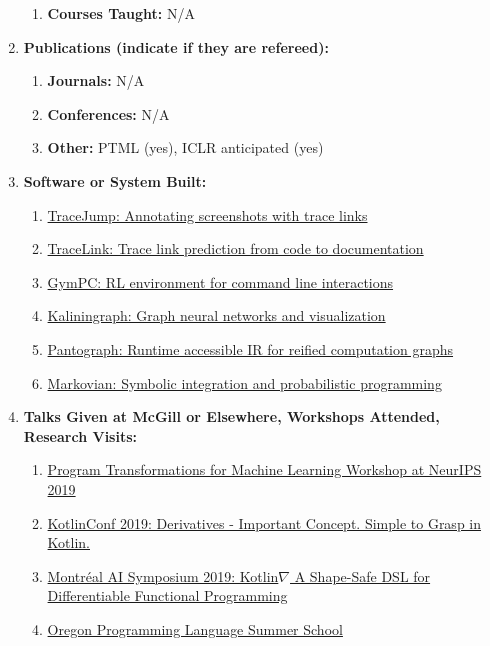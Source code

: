 \documentclass[11pt]{article}
\begin{document}
\begin{enumerate}
\begin{enumerate}
            \item \textbf{Courses Taught:} N/A

        \end{enumerate}

        \item \textbf{Publications (indicate if they are refereed):}
        \begin{enumerate}
            \item \textbf{Journals:} N/A

            \item \textbf{Conferences:} N/A

            \item \textbf{Other:} PTML (yes), ICLR anticipated (yes)

        \end{enumerate}

        \item \textbf{Software or System Built:}

        \begin{enumerate}
            \item \href{https://github.com/acejump/tracejump}{TraceJump: Annotating screenshots with trace links}
            \item \href{https://github.com/breandan/tracelink}{TraceLink: Trace link prediction from code to documentation}
            \item \href{https://github.com/breandan/gym-pc}{GymPC: RL environment for command line interactions}
            \item \href{https://github.com/breandan/kaliningraph}{Kaliningraph: Graph neural networks and visualization}
            \item \href{https://github.com/breandan/pantograph}{Pantograph: Runtime accessible IR for reified computation graphs}
            \item \href{https://github.com/breandan/markovian}{Markovian: Symbolic integration and probabilistic programming}
        \end{enumerate}

        \item \textbf{Talks Given at McGill or Elsewhere, Workshops Attended, Research Visits:}

        \begin{enumerate}
            \item \href{https://program-transformations.github.io/}{Program Transformations for Machine Learning Workshop at NeurIPS 2019}
            \item \href{https://kotlinconf.com/2019/talks/}{KotlinConf 2019: Derivatives - Important Concept. Simple to Grasp in Kotlin.}
            \item \href{https://kotlinconf.com/2019/talks/}{Montr\'eal AI Symposium 2019: Kotlin$\nabla$ A Shape-Safe DSL for Differentiable Functional Programming}
            \item \href{https://www.cs.uoregon.edu/research/summerschool/summer19/topics.php}{Oregon Programming Language Summer School}
        \end{enumerate}


\end{enumerate}
\end{document}
